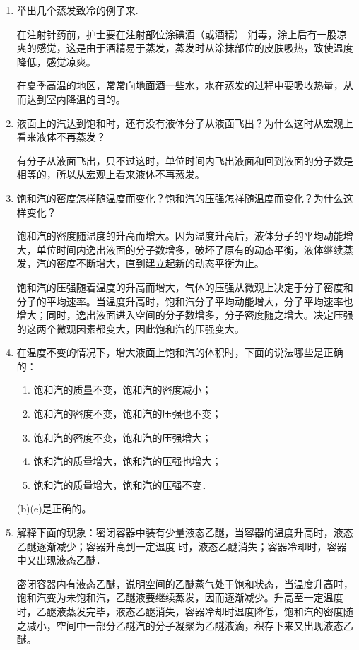 \begin{enumerate}
    \item 举出几个蒸发致冷的例子来.
    
    \begin{solution}
在注射针药前，护士要在注射部位涂碘酒（或酒精）
消毒，涂上后有一股凉爽的感觉，这是由于酒精易于蒸发，蒸发时从涂抹部位的皮肤吸热，致使温度降低，感觉凉爽。

在夏季高温的地区，常常向地面酒一些水，水在蒸发的过程中要吸收热量，从而达到室内降温的目的。      
    \end{solution}
\item 液面上的汽达到饱和时，还有没有液体分子从液面飞出？为什么这时从宏观上看来液体不再蒸发？
    
\begin{solution}
有分子从液面飞出，只不过这时，单位时间内飞出液面和回到液面的分子数是相等的，所以从宏观上看来液体不再蒸发。
\end{solution}
\item 饱和汽的密度怎样随温度而变化？饱和汽的压强怎祥随温度而变化？为什么这样变化？
    
\begin{solution}
饱和汽的密度随温度的升高而增大。因为温度升高后，液体分子的平均动能增大，单位时间内逸出液面的分子数增多，破坏了原有的动态平衡，液体继续蒸发，汽的密度不断增大，直到建立起新的动态平衡为止。

饱和汽的压强随着温度的升高而增大，气体的压强从微观上决定于分子密度和分子的平均速率。当温度升高时，饱和汽分子平均动能增大，分子平均速率也增大；同时，逸出液面进入空间的分子数增多，分子密度随之增大。决定压强的这两个微观因素都变大，因此饱和汽的压强变大。
\end{solution}
\item 在温度不变的情况下，增大液面上饱和汽的体积时，下面的说法哪些是正确的：
\begin{enumerate}
    \item 饱和汽的质量不变，饱和汽的密度减小；
    \item 饱和汽的密度不变，饱和汽的压强也不变；
    \item 饱和汽的密度不变，饱和汽的压强增大；
    \item 饱和汽的质量增大，饱和汽的压强也增大；
    \item 饱和汽的质量增大，饱和汽的压强不变．
\end{enumerate}

    
\begin{solution}
  (b)(e)是正确的。
\end{solution}
\item 解释下面的现象：密闭容器中装有少量液态乙醚，当容器的温度升高时，液态乙醚逐渐减少；容器升高到一定温度
时，液态乙醚消失；容器冷却时，容器中又出现液态乙醚．
    
\begin{solution}
  密闭容器内有液态乙醚，说明空间的乙醚蒸气处于饱和状态，当温度升高时，饱和汽变为未饱和汽，乙醚液要继续蒸发，因而逐渐减少。升高至一定温度时，乙醚液蒸发完毕，液态乙醚消失，容器冷却时温度降低，饱和汽的密度随之减小，空间中一部分乙醚汽的分子凝聚为乙醚液滴，积存下来又出现液态乙醚。
\end{solution}
\end{enumerate}




